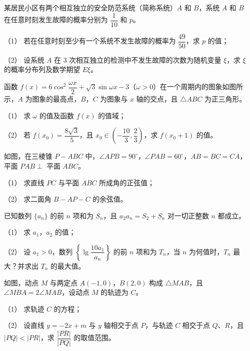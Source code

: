 \begin{question}
某居民小区有两个相互独立的安全防范系统（简称系统）$A$ 和 $B$，系统 $A$ 和 $B$ 在任意时刻发生故障的概率分别为 $\dfrac1{10}$ 和 $p$。

（1） 若在任意时刻至少有一个系统不发生故障的概率为 $\dfrac{49}{50}$，求 $p$ 的值；

（2） 设系统 $A$ 在 $3$ 次相互独立的检测中不发生故障的次数为随机变量 $\xi$，求 $\xi$ 的概率分布列及数学期望 $E\xi$。

\Needspace{0.4\textheight}
\end{question}
\begin{question}
函数 $f(x)=6\cos^2\dfrac{\omega x}{2}+\sqrt3\sin\omega x-3$（$\omega>0$）在一个周期内的图象如图所示，$A$ 为图象的最高点，$B$，$C$ 为图象与 $x$ 轴的交点，且 $\triangle ABC$ 为正三角形。

（1） 求 $\omega$ 的值及函数 $f(x)$ 的值域；

（2） 若 $f(x_0)=\dfrac{8\sqrt3}{5}$，且 $x_0\in\left(-\dfrac{10}3,\dfrac23\right)$，求 $f(x_0+1)$ 的值。
\nopagebreak[4]
\begin{center}\end{center}
\nopagebreak[4]
\Needspace{0.4\textheight}
\end{question}
\begin{question}
如图，在三棱锥 $P-ABC$ 中，$\angle APB=90^\circ$，$\angle PAB=60^\circ$，$AB=BC=CA$，平面 $PAB\perp$ 平面 $ABC$。

（1） 求直线 $PC$ 与平面 $ABC$ 所成角的正弦值；

（2） 求二面角 $B-AP-C$ 的余弦值。
\nopagebreak[4]
\begin{center}\end{center}
\nopagebreak[4]
\end{question}
\begin{question}
已知数列 $\{a_n\}$ 的前 $n$ 项和为 $S_n$，且 $a_2a_n=S_2+S_n$ 对一切正整数 $n$ 都成立。

（1） 求 $a_1$，$a_2$ 的值；

（2） 设 $a_1>0$，数列 $\left\{\lg\dfrac{10a_1}{a_n}\right\}$ 的前 $n$ 项和为 $T_n$，当 $n$ 为何值时，$T_n$ 最大？并求出 $T_n$ 的最大值。

\Needspace{0.4\textheight}
\end{question}
\begin{question}
如图，动点 $M$ 与两定点 $A(-1,0)$，$B(2,0)$ 构成 $\triangle MAB$，且 $\angle MBA=2\angle MAB$，设动点 $M$ 的轨迹为 $C$。

（1） 求轨迹 $C$ 的方程；

（2） 设直线 $y=-2x+m$ 与 $y$ 轴相交于点 $P$，与轨迹 $C$ 相交于点 $Q$、$R$，且 $|PQ|<|PR|$，求 $\dfrac{|PR|}{|PQ|}$ 的取值范围。
\nopagebreak[4]
\begin{center}\end{center}
\nopagebreak[4]
\end{question}
